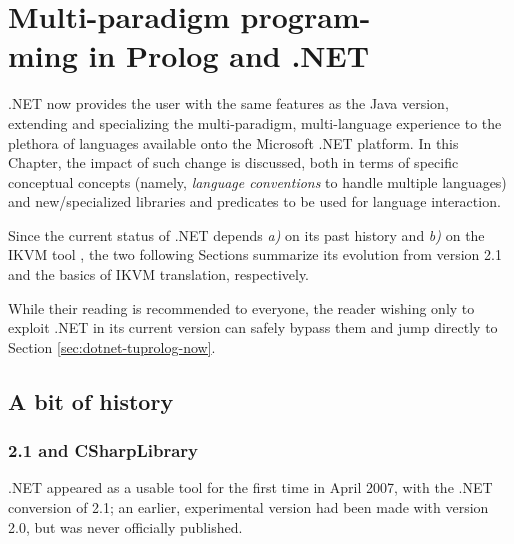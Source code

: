 \chapter[Multi-paradigm programming in Prolog and .NET]{Multi-paradigm program-\\ming in Prolog and .NET}
\label{ch:mpp-in-dotnet}

\tuprolog{}.NET now provides the user with the same features as the Java version, extending and specializing the multi-paradigm, multi-language experience to the plethora of languages available onto the Microsoft .NET platform.
In this Chapter, the impact of such change is discussed, both in terms of specific conceptual concepts (namely, \textit{language conventions} to handle multiple languages) and new/specialized libraries and predicates to be used for language interaction.

Since the current status of \tuprolog{}.NET depends \textit{a)} on its past history and \textit{b)} on the IKVM tool \cite{ikvm}, the two following Sections summarize its evolution from version 2.1 and the basics of IKVM translation, respectively.

While their reading is recommended to everyone, the reader wishing only to exploit \tuprolog{}.NET in its current version can safely bypass them and jump directly to Section \ref{sec:dotnet-tuprolog-now}.

\section{A bit of history}
\label{sec:dotnet-tuprolog-history}

\subsection{\tuprolog{} 2.1 and CSharpLibrary}
\label{ssec:dotnet-tuprolog2.1}

\tuprolog{}.NET appeared as a usable tool for the first time in April 2007, with the .NET conversion of \tuprolog{} 2.1; an earlier, experimental version had been made with version 2.0, but was never officially published.

